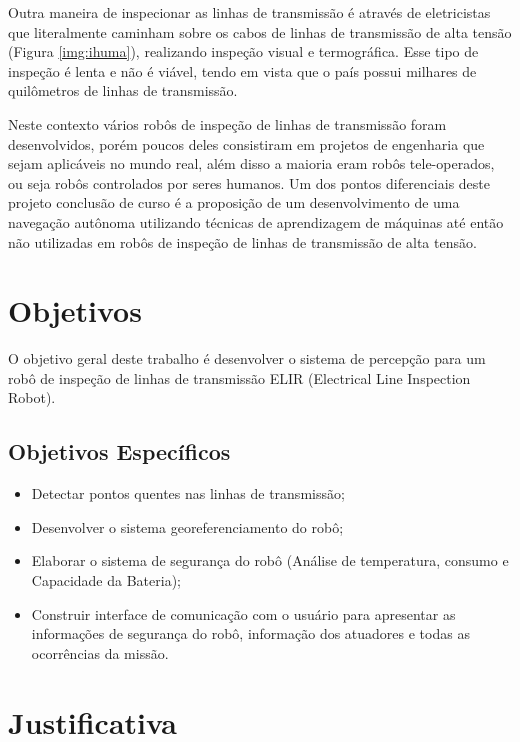 Outra maneira de inspecionar as linhas de transmissão é através de eletricistas que literalmente caminham sobre os cabos de linhas de transmissão de alta tensão (Figura \ref{img:ihuma}), realizando inspeção visual e termográfica. Esse tipo de inspeção é lenta e não é viável, tendo em vista que o país possui milhares de quilômetros de linhas de transmissão.

Neste contexto vários robôs de inspeção de linhas de transmissão foram desenvolvidos, porém poucos deles consistiram em projetos de engenharia que sejam aplicáveis no mundo real, além disso a maioria eram robôs tele-operados, ou seja robôs controlados por seres humanos. Um dos pontos diferenciais deste projeto conclusão de curso é a proposição de um desenvolvimento de uma navegação autônoma utilizando técnicas de aprendizagem de máquinas até então não utilizadas em robôs de inspeção de linhas de transmissão de alta tensão.

\section{Objetivos}
\label{sec:obj}

O  objetivo geral deste  trabalho   é  desenvolver o sistema de percepção para um robô de inspeção de linhas de transmissão ELIR (Electrical Line Inspection Robot).


\subsection{Objetivos Específicos}
\label{ssec:objesp}

\begin{itemize}
\item Detectar pontos quentes nas linhas de transmissão;
\item Desenvolver o sistema georeferenciamento do robô;
\item Elaborar o sistema de segurança do robô (Análise de temperatura, consumo e Capacidade da Bateria);
\item Construir interface de comunicação com o usuário para apresentar as informações de segurança do robô, informação dos atuadores e todas as ocorrências da missão.
\end{itemize}

\section{Justificativa}
\label{sec:justi}

